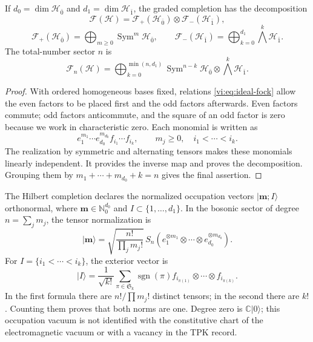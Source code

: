 \begin{theorem}
\label{vi:thm:fock-graduado}
If \(d_0=\dim\mathcal H_{\bar0}\) and
\(d_1=\dim\mathcal H_{\bar1}\), the graded completion has
the decomposition
\begin{equation}
 \mathcal F(\mathcal H)=
 \mathcal F_+(\mathcal H_{\bar0})\otimes
 \mathcal F_-(\mathcal H_{\bar1}),
 \label{vi:eq:fock-producto}
\end{equation}
\[
 \mathcal F_+(\mathcal H_{\bar0})=
 \bigoplus_{m\ge0}\operatorname{Sym}^m\mathcal H_{\bar0},
 \qquad
 \mathcal F_-(\mathcal H_{\bar1})=
 \bigoplus_{k=0}^{d_1}\bigwedge^k\mathcal H_{\bar1}.
\]
The total-number sector \(n\) is
\[
 \mathcal F_n(\mathcal H)=
 \bigoplus_{k=0}^{\min(n,d_1)}
 \operatorname{Sym}^{n-k}\mathcal H_{\bar0}
 \otimes\bigwedge^k\mathcal H_{\bar1}.
\]
\end{theorem}
\begin{proof}
With ordered homogeneous bases fixed, relations
\eqref{vi:eq:ideal-fock} allow the even factors to be placed first
and the odd factors afterwards. Even factors commute; odd factors
anticommute, and the square of an odd factor is zero because we work
in characteristic zero. Each monomial is written as
\[
 e_1^{m_1}\cdots e_{d_0}^{m_{d_0}}
 f_{i_1}\cdots f_{i_k},
 \qquad m_j\ge0,\quad i_1<\cdots<i_k.
\]
The realization by symmetric and alternating tensors makes these
monomials linearly independent. It provides the inverse map and proves
the decomposition. Grouping them by
\(m_1+\cdots+m_{d_0}+k=n\) gives the final assertion.
\end{proof}

The Hilbert completion declares the normalized occupation vectors
\(|\boldsymbol m;I\rangle\) orthonormal, where
\(\boldsymbol m\in\mathbb N_0^{d_0}\) and
\(I\subset\{1,\ldots,d_1\}\). In the bosonic sector of degree
\(n=\sum_jm_j\), the tensor normalization is
\[
 |\boldsymbol m\rangle=
 \sqrt{\frac{n!}{\prod_jm_j!}}\,
 S_n(e_1^{\otimes m_1}\otimes\cdots\otimes
 e_{d_0}^{\otimes m_{d_0}}).
\]
For \(I=\{i_1<\cdots<i_k\}\), the exterior vector is
\[
 |I\rangle=\frac1{\sqrt{k!}}\sum_{\pi\in\mathfrak S_k}
 \operatorname{sgn}(\pi)
 f_{i_{\pi(1)}}\otimes\cdots\otimes f_{i_{\pi(k)}}.
\]
In the first formula there are \(n!/\prod m_j!\) distinct tensors;
in the second there are \(k!\). Counting them proves that both norms
are one. Degree zero is \(\mathbb C|0\rangle\); this occupation
vacuum is not identified with the constitutive chart of the electromagnetic
vacuum or with a vacancy in the TPK record.

